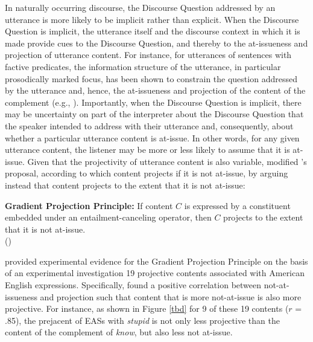 \documentclass[11pt,fleqn]{article}
\newcommand{\6}{\mbox{$[\hspace*{-.6mm}[$}}
\newcommand{\9}{\mbox{$]\hspace*{-.6mm}]$}}
\newcommand{\citepos}[1]{\citeauthor{#1}'s \citeyear{#1}}
\begin{document}
In naturally occurring discourse, the Discourse Question addressed by an utterance is more likely to be implicit rather than explicit. When the Discourse Question is implicit, the utterance itself and the discourse context in which it is made provide cues to the Discourse Question, and thereby to the at-issueness and projection of utterance content. For instance, for utterances of sentences with factive predicates, the information structure of the utterance, in particular prosodically marked focus, has been shown to constrain the question addressed by the utterance and, hence, the at-issueness and projection of the content of the complement (e.g., \citealt{beaver01,cummins-rohde2015,tonhauser-salt26,best-question,djaerv-bacovcin-salt27,mahler-nels}). Importantly, when the Discourse Question is implicit, there may be uncertainty on part of the interpreter about the Discourse Question that the speaker intended to address with their utterance and, consequently, about whether a particular utterance content is at-issue. In other words, for any given utterance content, the listener may be more or less likely to assume that it is at-issue. Given that the projectivity of utterance content is also variable, \citealt{tbd-variability} modified \citepos{best-question} proposal, according to which content projects if it is not at-issue, by arguing instead that content projects to the extent that it is not at-issue:

\begin{exe}
\ex\label{gpp} {\bf Gradient Projection Principle:} If content $C$ is expressed by a constituent embedded under an entailment-canceling operator, then $C$ projects to the extent that it is not at-issue. \\ \hspace*{.2cm} \hfill (\citealt[499]{tbd-variability})
\end{exe}

\citealt{tbd-variability} provided experimental evidence for the Gradient Projection Principle on the basis of an experimental investigation 19 projective contents associated with American English expressions. Specifically, \citet{tbd-variability} found a positive correlation between not-at-issueness and projection such that content that is more not-at-issue is also more projective. For instance, as shown in Figure \ref{tbd} for 9 of these 19 contents ($r$ = .85), the prejacent of EASs with {\em stupid} is not only less projective than the content of the complement of {\em know}, but also less not at-issue.
\end{document}
